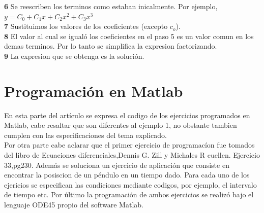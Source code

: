 \documentclass[12pt,letterpaper,oneside]{article}
\begin{document}
  \hspace*{0.3cm} \textbf{6} Se reescriben los terminos como estaban inicalmente. Por ejemplo, $y= C_0 + C_1x+ C_2x^2 + C_3x^3$\vspace{0.3cm}\\
  \hspace*{0.3cm} \textbf{7} Sustituimos los valores de los coeficientes (excepto $c_o$).\vspace{0.3cm}\\
   \hspace*{0.3cm} \textbf{8} El valor al cual se igualó los coeficientes en el paso 5 es un valor comun en los demas terminos. Por lo tanto se simplifica la expresion factorizando.\vspace{0.3cm}\\
   \hspace*{0.3cm} \textbf{9} La expresion que se obtenga es la solución.\vspace{0.3cm}\\
   
   
\section{Programación en Matlab}
En esta parte del artículo se expresa el codigo de los ejercicios programados en Matlab, cabe resaltar que son diferentes al ejemplo 1, no obstante tambien cumplen con las especificaciones del tema explicado.\\
Por otra parte cabe aclarar que el primer ejercicio de programacíon fue tomados del libro de Ecuaciones diferenciales,Dennis G. Zill y Michales R cuellen. Ejercicio 33,pg230. Además se soluciona un ejercicio de aplicación que consiste en encontrar la posiscion de un péndulo en un tiempo dado. Para cada uno de los ejericios se especifican las condiciones mediante codigos, por ejemplo, el intervalo de tiempo etc. Por último la programación de ambos ejercicios se realizó bajo el lenguaje ODE45 propio del software Matlab.\\
\end{document}
